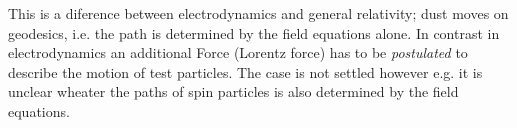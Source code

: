 \begin{remark}
This is a diference between electrodynamics and general relativity; dust moves
on geodesics, i.e. the path is determined by the field equations alone. In contrast
in electrodynamics an additional Force (Lorentz force) has to be
\emph{postulated} to describe the motion of test particles. The case is not
settled however e.g. it is unclear wheater the paths of spin particles is also
determined by the field equations.
\end{remark}